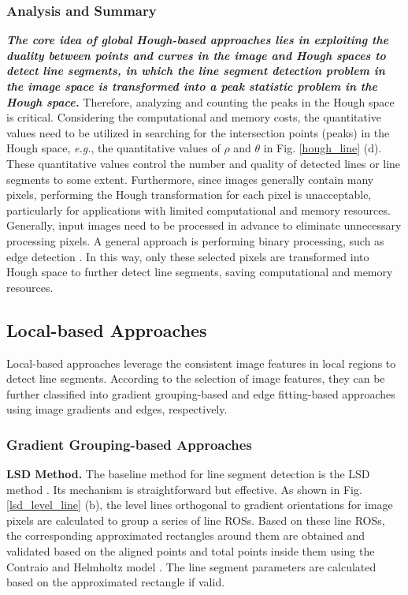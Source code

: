 \documentclass[journal,compsoc]{IEEEtran}
\begin{document}
\subsubsection{Analysis and Summary}
\textit{\textbf{The core idea of global Hough-based approaches lies in exploiting the duality between points and curves in the image and Hough spaces to detect line segments, in which the line segment detection problem in the image space is transformed into a peak statistic problem in the Hough space.}} Therefore, analyzing and counting the peaks in the Hough space is critical. Considering the computational and memory costs, the quantitative values need to be utilized in searching for the intersection points (peaks) in the Hough space, \textit{e.g.}, the quantitative values of $\rho$ and $\theta$ in Fig. \ref{hough_line} (d). These quantitative values control the number and quality of detected lines or line segments to some extent. Furthermore, since images generally contain many pixels, performing the Hough transformation for each pixel is unacceptable, particularly for applications with limited computational and memory resources. Generally, input images need to be processed in advance to eliminate unnecessary processing pixels. A general approach is performing binary processing, such as edge detection \cite{Canny}. In this way, only these selected pixels are transformed into Hough space to further detect line segments, saving computational and memory resources.




\subsection{Local-based Approaches}
\label{subsec_local_based}
Local-based approaches leverage the consistent image features in local regions to detect line segments. According to the selection of image features, they can be further classified into gradient grouping-based and edge fitting-based approaches using image gradients and edges, respectively.

\subsubsection{Gradient Grouping-based Approaches}
\label{subsubsec_detection_gradient}
\textbf{LSD Method.} The baseline method for line segment detection is the LSD method \cite{LSD, LSDaLineSegmentDetector}. Its mechanism is straightforward but effective. As shown in Fig. \ref{lsd_level_line} (b), the level lines orthogonal to gradient orientations for image pixels are calculated to group a series of line ROSs. Based on these line ROSs, the corresponding approximated rectangles around them are obtained and validated based on the aligned points and total points inside them using the Contraio and Helmholtz model \cite{desolneux2007gestalt}. The line segment parameters are calculated based on the approximated rectangle if valid.
\end{document}
